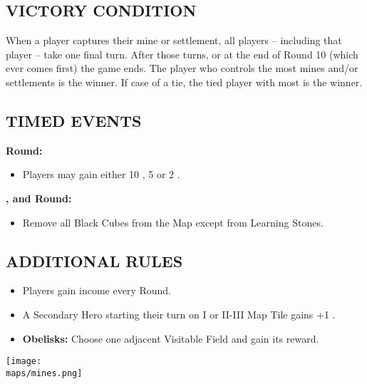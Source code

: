 \begin{multicols*}{2}
\subsection*{\MakeUppercase{Victory Condition}}
When a player captures their  mine or settlement, all players -- including that player -- take one final turn. After those turns, or at the end of Round 10 (which ever comes first) the game ends. The player who controls the most mines and/or settlements is the winner. If case of a tie, the tied player with most  is the winner.

\subsection*{\MakeUppercase{Timed Events}}
\textbf{ Round:}
\begin{itemize}
  \item Players may gain either 10 , 5  or 2 .
\end{itemize}
\textbf{,  and  Round:}
\begin{itemize}
  \item Remove all Black Cubes from the Map except from Learning Stones.
\end{itemize}
\subsection*{\MakeUppercase{Additional Rules}}
\begin{itemize}
  \item Players gain income every Round.
  \item A Secondary Hero starting their turn on I or II-III Map Tile gains +1 .
  \item \textbf{Obelisks:} Choose one adjacent Visitable Field and gain its reward.
\end{itemize}

\begin{center}
  \vfill
  \texttt{[image: \\maps/mines.png]}
  \vfill
\end{center}

\end{multicols*}
